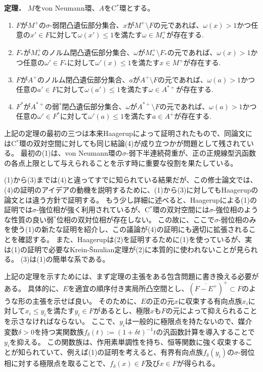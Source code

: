 \documentclass[noamsfonts,a4paper,10pt]{amsart}
\theoremstyle{plain}
\theoremstyle{definition}
\theoremstyle{remark}
\begin{document}
\textbf{定理．}
$M$をvon Neumann環、$A$をC$^*$環とする。
\begin{enumerate}
\item $F$が$M^+$の$\sigma$-弱閉凸遺伝部分集合、$x$が$M^+\setminus F$の元であれば、$\omega(x)>1$\quad かつ任意の$x'\in F$に対して$\omega(x')\le1$を満たす$\omega\in M_*^+$が存在する.
\item $F_*$が$M_*^+$のノルム閉凸遺伝部分集合、$\omega$が$M_*^+\setminus F_*$の元であれば、$\omega(x)>1$\quad かつ任意の$\omega'\in F_*$に対して$\omega'(x)\le1$を満たす$x\in M^+$が存在する.
\item $F$が$A^+$のノルム閉凸遺伝部分集合、$a$が$A^+\setminus F$の元であれば、$\omega(a)>1$\quad かつ任意の$a'\in F$に対して$\omega(a')\le1$を満たす$\omega\in A^{*+}$が存在する.
\item $F^*$が$A^{*+}$の弱$^*$閉凸遺伝部分集合、$\omega$が$A^{*+}\setminus F$の元であれば、$\omega(a)>1$\quad かつ任意の$\omega'\in F^*$に対して$\omega'(a)\le1$を満たす$a\in A^+$が存在する.
\end{enumerate}

上記の定理の最初の三つは本来Haagerupによって証明されたもので、同論文にはC$^*$環の双対空間に対しても同じ結論(4)が成り立つかが問題として残されている。
最初の(1)は、von Neumann環の$\sigma$-弱下半連続荷重が、正の正規線型汎函数の各点上限として与えられることを示す時に重要な役割を果たしている。

(1)から(3)までは(4)と違ってすでに知られている結果だが、この修士論文では、(4)の証明のアイデアの動機を説明するために、(1)から(3)に対してもHaagerupの論文とは違う方針で証明する。
もう少し詳細に述べると、Haagerupによる(1)の証明では$\sigma$-強位相が強く利用されているが、C$^*$環の双対空間には$\sigma$-強位相のような性質の良い弱$^*$位相の双対位相が存在しない。
この故に、ここで$\sigma$-弱位相のみを使う(1)の新たな証明を紹介し、この議論が(4)の証明にも適切に拡張されることを確認する。
また、Haagerupは(2)を証明するために(1)を使っているが、実は(1)の証明で必要なKrein-\v Smulian定理が(2)に本質的に使われないことが見られる。
(3)は(1)の簡単な系である。

上記の定理を示すためには、まず定理の主張をある包含問題に書き換える必要がある。
具体的に、$E$を適宜の順序付き実局所凸空間とし、$(\overline{F-E^+})^+\subset F$のような形の主張を示せば良い。
そのために、$E$の正の元$x$に収束する有向点族$x_i$に対して$x_i\le y_i$を満たす$y_i\in F$があるとし、極限$x$も$F$の元によって抑えられることを示さなければならない。
ここで、$y_i$は一般的に極限点を持たないので、媒介変数$\delta>0$を持つ実関数族$f_\delta(t):=(1+\delta t)^{-1}t$の汎函数計算を導入することで$y_i$を抑える。
この関数族は、作用素単調性を持ち、恒等関数に強く収束することが知られていて、例えば(1)の証明を考えると、有界有向点族$f_\delta(y_i)$の$\sigma$-弱位相に対する極限点を取ることで、$f_\delta(x)\in F$及び$x\in F$が得られる。
\end{document}

